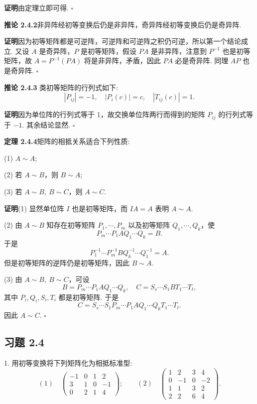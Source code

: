 \documentclass[UTF8, 12pt, fontset=fandol, oneside]{ctexart}
\begin{document}
\noindent\textbf{证明}\quad 由定理立即可得. $\square$

\noindent\textbf{推论 2.4.2}\quad 非异阵经初等变换后仍是非异阵，奇异阵经初等变换后仍是奇异阵.

\noindent\textbf{证明}\quad 因为初等矩阵都是可逆阵，可逆阵和可逆阵之积仍可逆，所以第一个结论成立. 又设 $A$ 是奇异阵，$P$ 是初等矩阵，假设 $PA$ 是非异阵，注意到 $P^{-1}$ 也是初等矩阵，故 $A=P^{-1}(PA)$ 将是非异阵，矛盾，因此 $PA$ 必是奇异阵. 同理 $AP$ 也是奇异阵. $\square$

\noindent\textbf{推论 2.4.3} 类初等矩阵的行列式如下:
\[
|P_{ij}|=-1,\quad |P_i(c)|=c,\quad |T_{ij}(c)|=1.
\]

\noindent\textbf{证明}\quad 因为单位阵的行列式等于 1，故交换单位阵两行而得到的矩阵 $P_{ij}$ 的行列式等于 $-1$. 其余结论显然. $\square$

\noindent\textbf{定理 2.4.4}\quad 矩阵的相抵关系适合下列性质:

(1) $A\sim A$;

(2) 若 $A\sim B$，则 $B\sim A$;

(3) 若 $A\sim B,\ B\sim C$，则 $A\sim C$.

\noindent\textbf{证明}\quad (1) 显然单位阵 $I$ 也是初等矩阵，而 $IA=A$ 表明 $A\sim A$.

(2) 由 $A\sim B$ 知存在初等矩阵 $P_1,\cdots,P_m$ 以及初等矩阵 $Q_1,\cdots,Q_k$，使
\[
P_m\cdots P_1AQ_1\cdots Q_k=B.
\]
于是
\[
P_1^{-1}\cdots P_m^{-1}BQ_k^{-1}\cdots Q_1^{-1}=A.
\]
但是初等矩阵的逆阵仍是初等矩阵，因此 $B\sim A$.

(3) 由 $A\sim B,\ B\sim C$，可设
\[
B=P_m\cdots P_1AQ_1\cdots Q_k,\quad C=S_s\cdots S_1BT_1\cdots T_t,
\]
其中 $P_i,Q_i,S_i,T_i$ 都是初等矩阵. 于是
\[
C=S_s\cdots S_1P_m\cdots P_1AQ_1\cdots Q_kT_1\cdots T_t.
\]
因此 $A\sim C$. $\square$

\subsection*{习题 2.4}

1. 用初等变换将下列矩阵化为相抵标准型:
\[
(1)\quad
\left(\begin{array}{rrrr}
-1 & 0 & 1 & 2\\
3 & 1 & 0 & -1\\
0 & 2 & 1 & 4
\end{array}\right);
\qquad
(2)\quad
\left(\begin{array}{rrrr}
1 & 2 & 3 & 4\\
0 & -1 & 0 & -2\\
1 & 1 & 3 & 2\\
2 & 2 & 6 & 4
\end{array}\right).
\]
\end{document}
